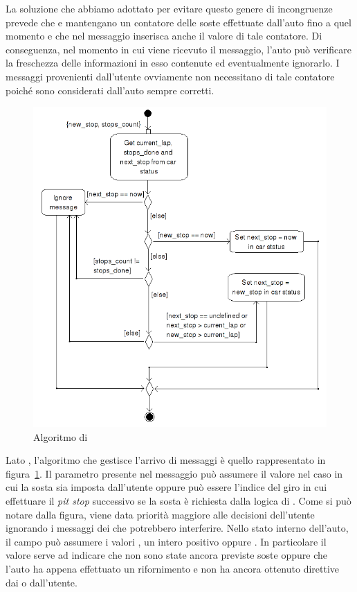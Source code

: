 La soluzione che abbiamo adottato per evitare questo genere di incongruenze prevede che \car{} e \team{} mantengano un contatore delle soste effettuate dall'auto fino a quel momento e che \team{} nel messaggio  inserisca anche il valore di tale contatore. Di conseguenza, nel momento in cui viene ricevuto il messaggio, l'auto può verificare la freschezza delle informazioni in esso contenute ed eventualmente ignorarlo. I messaggi provenienti dall'utente ovviamente non necessitano di tale contatore poiché sono considerati dall'auto sempre corretti.

\begin{figure}
\includegraphics[width=\textwidth]{diagrammi/NextPitstop}
\caption{Algoritmo di }
\label{fig:nextPitstop}
\end{figure}

Lato \car{}, l'algoritmo che gestisce l'arrivo di messaggi  è quello rappresentato in figura~\ref{fig:nextPitstop}. Il parametro  presente nel messaggio  può assumere il valore  nel caso in cui la sosta sia imposta dall'utente oppure può essere l'indice del giro in cui effettuare il \textit{pit stop} successivo se la sosta è richiesta dalla logica di \team{}. Come si può notare dalla figura, viene data priorità maggiore alle decisioni dell'utente ignorando i messaggi dei \team{} che potrebbero interferire. Nello stato interno dell'auto, il campo  può assumere i valori , un intero positivo oppure . In particolare il valore  serve ad indicare che non sono state ancora previste soste oppure che l'auto ha appena effettuato un rifornimento e non ha ancora ottenuto direttive dai \team{} o dall'utente.

